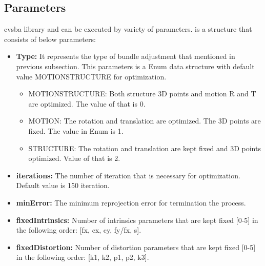 \subsection{Parameters}
cvsba library and  can be executed by variety of parameters.  is a structure that consists of below parameters:
\begin{itemize}
\item \textbf{Type:} It represents the type of bundle adjustment that mentioned in previous subsection. This parameters is a Enum data structure with default value MOTIONSTRUCTURE for optimization.
		\begin{itemize}
			\item MOTIONSTRUCTURE: Both structure {3D points} and motion {R and T} are optimized. The value of that is 0.
			\item MOTION: The rotation and translation are optimized. The 3D points are fixed. The value in Enum is 1.
			\item STRUCTURE: The rotation and translation are kept fixed and 3D points optimized. Value of that is 2. 
		\end {itemize}
\item \textbf{iterations:} The number of iteration that is necessary for optimization. Default value is 150 iteration.
\item \textbf{minError:} The minimum reprojection error for termination the process.
\item \textbf{fixedIntrinsics:} Number of intrinsics parameters that are kept fixed [0-5] in the following order: [fx, cx, cy, fy/fx, s].
\item \textbf{fixedDistortion:} Number of distortion parameters that are kept fixed [0-5] in the following order: [k1, k2, p1, p2, k3].
\end{itemize}

